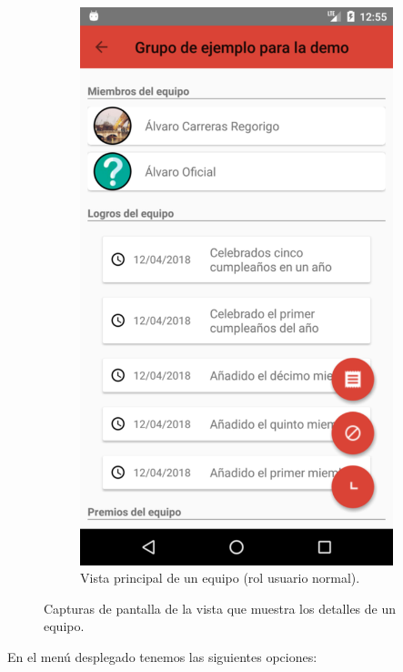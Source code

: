 \documentclass[twoside]{report}
\begin{document}
\begin{figure}[H]
\begin{center}
\begin{subfigure}[t]{.3\linewidth}
		\includegraphics[scale=0.2]{images/userguide/16.png}
		\caption{Vista principal de un equipo (rol usuario normal).}
	\end{subfigure}\hspace{2mm}%
\caption{Capturas de pantalla de la vista que muestra los detalles de un equipo.}
\end{center}
\end{figure}
En el menú desplegado tenemos las siguientes opciones:
\end{document}
